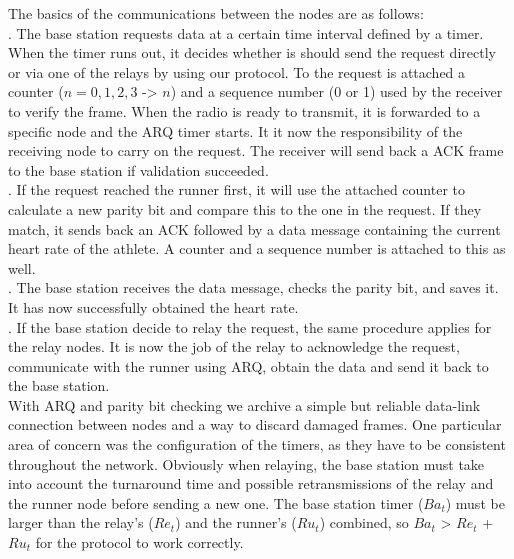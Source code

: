 \noindent The basics of the communications between the nodes are as follows: \\ . The base station requests data at a certain time interval defined by a timer. When the timer runs out, it decides whether is should send the request directly or via one of the relays by using our protocol. To the request is attached a counter ($n = 0, 1, 2, 3$ -> $n$) and a sequence number (0 or 1) used by the receiver to verify the frame. When the radio is ready to transmit, it is forwarded to a specific node and the ARQ timer starts. It it now the responsibility of the receiving node to carry on the request. The receiver will send back a ACK frame to the base station if validation succeeded.\\ . If the request reached the runner first, it will use the attached counter to calculate a new parity bit and compare this to the one in the request. If they match, it sends back an ACK followed by a data message containing the current heart rate of the athlete. A counter and a sequence number is attached to this as well.\\ . The base station receives the data message, checks the parity bit, and saves it. It has now successfully obtained the heart rate.\\ . If the base station decide to relay the request, the same procedure applies for the relay nodes. It is now the job of the relay to acknowledge the request, communicate with the runner using ARQ, obtain the data and send it back to the base station.\\ \newline
\noindent With ARQ and parity bit checking we archive a simple but reliable data-link connection between nodes and a way to discard damaged frames. One particular area of concern was the configuration of the timers, as they have to be consistent throughout the network. Obviously when relaying, the base station must take into account the turnaround time and possible retransmissions of the relay and the runner node before sending a new one. The base station timer ($Ba_t$) must be larger than the relay's ($Re_t$) and the runner's ($Ru_t$) combined, so $Ba_t$ > $Re_t$ + $Ru_t$ for the protocol to work correctly.